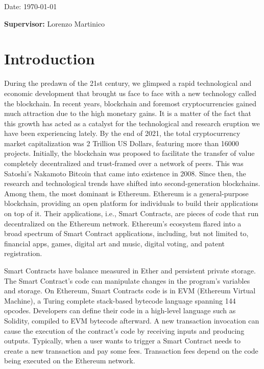 \documentclass[a4paper,11pt]{article}
\newcommand{\supervisor}{Lorenzo Martinico}
\begin{document}
\vspace*{3cm}
Date: \today

\vfill
{\bf Supervisor:} \supervisor
\newpage

\setcounter{page}{1}                            %
\footruleheight{1pt}
\headruleheight{1pt}
\rhead{- \thepage}
\cfoot{}
%

\section{Introduction}

During the predawn of the 21st century, we glimpsed a rapid technological and
economic development that brought us face to face with a new technology called
the blockchain. In recent years, blockchain and foremost cryptocurrencies gained
much attraction due to the high monetary gains. It is a matter of the fact that
this growth has acted as a catalyst for the technological and research eruption
we have been experiencing lately. By the end of 2021, the total cryptocurrency
market capitalization was 2 Trillion US Dollars\cite{coinmarketcap}, featuring
more than 16000 projects\cite{coinmarketcap}. Initially, the blockchain was
proposed to facilitate the transfer of value completely decentralized and
trust-framed over a network of peers. This was Satoshi's Nakamoto
Bitcoin\cite{nakamoto2008bitcoin} that came into existence in 2008. Since then,
the research and technological trends have shifted into second-generation
blockchains. Among them, the most dominant is
Ethereum\cite{buterin2013ethereum}. Ethereum is a general-purpose blockchain,
providing an open platform for individuals to build their applications on top of
it. Their applications, i.e., Smart Contracts, are pieces of code that run
decentralized on the Ethereum network. Ethereum's ecosystem flared into a broad
spectrum of Smart Contract applications, including, but not limited to,
financial apps, games, digital art and music, digital voting, and patent
registration. 

Smart Contracts have balance measured in Ether and persistent private storage.
The Smart Contract's code can manipulate changes in the program's variables and
storage. On Ethereum, Smart Contracts code is in EVM\cite{evm} (Ethereum Virtual
Machine), a Turing complete stack-based bytecode language spanning 144
opcodes\cite{opcodes}. Developers can define their code in a high-level
language such as Solidity\cite{solidity}, compiled to EVM bytecode afterward. A new
transaction invocation can cause the execution of the contract's code by
receiving inputs and producing outputs. Typically, when a user wants to trigger
a Smart Contract needs to create a new transaction and pay some fees\cite{gas_fees}.
Transaction fees depend on the code being executed on the Ethereum network.
\end{document}
